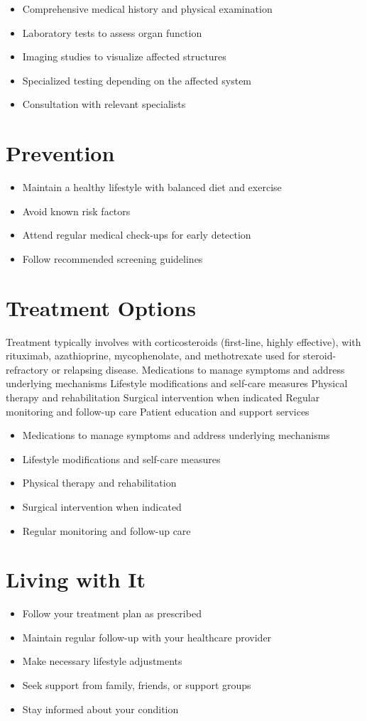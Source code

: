 \begin{itemize}[noitemsep]
  \item Comprehensive medical history and physical examination
  \item Laboratory tests to assess organ function
  \item Imaging studies to visualize affected structures
  \item Specialized testing depending on the affected system
  \item Consultation with relevant specialists
\end{itemize}
\section{Prevention}
\begin{itemize}[noitemsep]
  \item Maintain a healthy lifestyle with balanced diet and exercise
  \item Avoid known risk factors
  \item Attend regular medical check-ups for early detection
  \item Follow recommended screening guidelines
\end{itemize}
\section{Treatment Options}
Treatment typically involves with corticosteroids (first-line, highly effective), with rituximab, azathioprine, mycophenolate, and methotrexate used for steroid-refractory or relapsing disease. Medications to manage symptoms and address underlying mechanisms Lifestyle modifications and self-care measures Physical therapy and rehabilitation Surgical intervention when indicated Regular monitoring and follow-up care Patient education and support services

\begin{itemize}[noitemsep]
  \item Medications to manage symptoms and address underlying mechanisms
  \item Lifestyle modifications and self-care measures
  \item Physical therapy and rehabilitation
  \item Surgical intervention when indicated
  \item Regular monitoring and follow-up care
\end{itemize}
\section{Living with It}
\begin{itemize}[noitemsep]
  \item Follow your treatment plan as prescribed
  \item Maintain regular follow-up with your healthcare provider
  \item Make necessary lifestyle adjustments
  \item Seek support from family, friends, or support groups
  \item Stay informed about your condition
\end{itemize}
